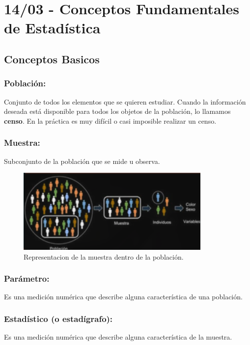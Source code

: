 \documentclass[12pt, letterpaper]{article}
\begin{document}
\newpage
\tableofcontents
\newpage %

\section{14/03 - Conceptos Fundamentales de Estadística}
\subsection{Conceptos Basicos}
\subsubsection{Población:}
Conjunto de todos los elementos que se quieren estudiar. Cuando la información deseada está disponible para todos los objetos de la población, lo llamamos \textbf{censo}. En la práctica es muy difícil o casi imposible realizar un censo.

\subsubsection{Muestra:}
Subconjunto de la población que se mide u observa.

\begin{figure}[h]
	\centering
	\includegraphics[width=0.85\textwidth]{muestra}
	\caption{Representacion de la muestra dentro de la población.}
	\label{fig:muestra}
\end{figure}


\subsubsection{Parámetro:}
Es una medición numérica que describe alguna característica de una población.

\subsubsection{Estadístico (o estadígrafo):}
Es una medición numérica que describe alguna característica de la muestra.
\end{document}
